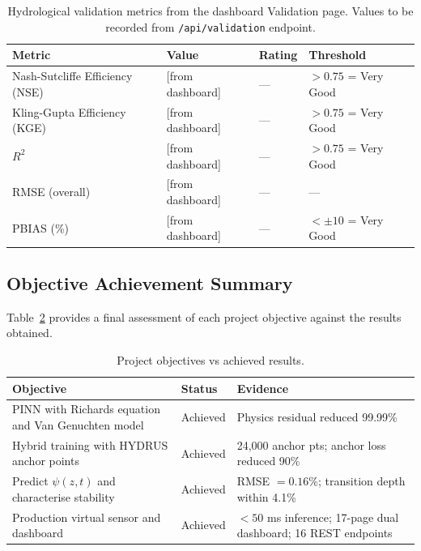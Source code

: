 \documentclass[12pt]{report}
\begin{document}
\begin{table}[htbp]
\centering
\begin{tabular}{llll}
\hline
\textbf{Metric} & \textbf{Value} & \textbf{Rating} &
\textbf{Threshold} \\
\hline
Nash-Sutcliffe Efficiency (NSE) & [from dashboard] & --- & $> 0.75$ = Very Good \\
Kling-Gupta Efficiency (KGE)    & [from dashboard] & --- & $> 0.75$ = Very Good \\
$R^2$                           & [from dashboard] & --- & $> 0.75$ = Very Good \\
RMSE (overall)                  & [from dashboard] & --- & --- \\
PBIAS (\%)                      & [from dashboard] & --- & $< \pm 10$ = Very Good \\
\hline
\end{tabular}
\caption{Hydrological validation metrics from the dashboard
Validation page. Values to be recorded from
\texttt{/api/validation} endpoint.}
\label{tab:hydro_metrics}
\end{table}

\subsection{Objective Achievement Summary}

Table~\ref{tab:objectives} provides a final assessment of each
project objective against the results obtained.

\begin{table}[htbp]
\centering
\begin{tabular}{p{5.5cm}lp{5cm}}
\hline
\textbf{Objective} & \textbf{Status} & \textbf{Evidence} \\
\hline
PINN with Richards equation and Van Genuchten model
  & Achieved
  & Physics residual reduced 99.99\% \\
Hybrid training with HYDRUS anchor points
  & Achieved
  & 24,000 anchor pts; anchor loss reduced 90\% \\
Predict $\psi(z,t)$ and characterise stability
  & Achieved
  & RMSE $= 0.16\%$; transition depth within 4.1\% \\
Production virtual sensor and dashboard
  & Achieved
  & $<50$ ms inference; 17-page dual dashboard;
    16 REST endpoints \\
\hline
\end{tabular}
\caption{Project objectives vs achieved results.}
\label{tab:objectives}
\end{table}
\end{document}
